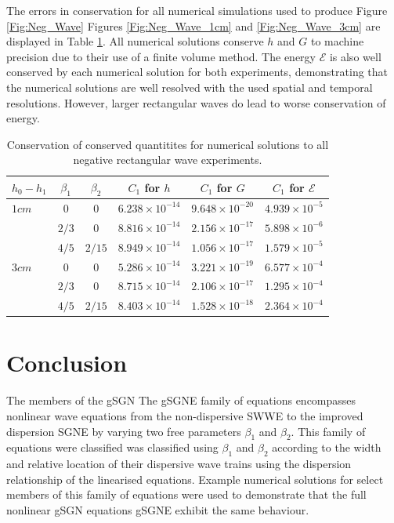 \documentclass[10pt]{elsarticle}
\newcommand\T{\rule{0pt}{3ex }}       %
\newcommand\B{\rule[-4ex]{0pt}{4ex }} %
\providecommand{\DIFaddtex}[1]{{\protect\color{blue} \sf #1}} %
\providecommand{\DIFdeltex}[1]{{\protect\color{red} \scriptsize #1}} %
\providecommand{\DIFaddbegin}{} %
\providecommand{\DIFaddend}{} %
\providecommand{\DIFdelbegin}{} %
\providecommand{\DIFdelend}{} %
\providecommand{\DIFadd}[1]{\texorpdfstring{\DIFaddtex{#1}}{#1}} %
\providecommand{\DIFdel}[1]{\texorpdfstring{\DIFdeltex{#1}}{}} %
\newcommand{\DIFscaledelfig}{0.5}
\newlength{\DIFdelgraphicswidth} %
\newlength{\DIFdelgraphicsheight} %
\newcommand{\DIFaddincludegraphics}[2][]{{\color{blue}\fbox{\DIFOincludegraphics[#1]{#2}}}} %
\newcommand{\DIFdelincludegraphics}[2][]{%
\sbox{\DIFdelgraphicsbox}{\DIFOincludegraphics[#1]{#2}}%
\settoboxwidth{\DIFdelgraphicswidth}{\DIFdelgraphicsbox} %
\settoboxtotalheight{\DIFdelgraphicsheight}{\DIFdelgraphicsbox} %
\scalebox{\DIFscaledelfig}{%
\parbox[b]{\DIFdelgraphicswidth}{\usebox{\DIFdelgraphicsbox}\\[-\baselineskip] \rule{\DIFdelgraphicswidth}{0em}}\llap{\resizebox{\DIFdelgraphicswidth}{\DIFdelgraphicsheight}{%
\setlength{\unitlength}{\DIFdelgraphicswidth}%
\begin{picture}(1,1)%
\thicklines\linethickness{2pt} %
{\color[rgb]{1,0,0}\put(0,0){\framebox(1,1){}}}%
{\color[rgb]{1,0,0}\put(0,0){\line( 1,1){1}}}%
{\color[rgb]{1,0,0}\put(0,1){\line(1,-1){1}}}%
\end{picture}%
}\hspace*{3pt}}} %
} %
\DeclareRobustCommand{\DIFaddbegin}{\DIFOaddbegin \let\includegraphics\DIFaddincludegraphics} %
\DeclareRobustCommand{\DIFaddend}{\DIFOaddend \let\includegraphics\DIFOincludegraphics} %
\DeclareRobustCommand{\DIFdelbegin}{\DIFOdelbegin \let\includegraphics\DIFdelincludegraphics} %
\DeclareRobustCommand{\DIFdelend}{\DIFOaddend \let\includegraphics\DIFOincludegraphics} %
\begin{document}
The errors in conservation for all numerical simulations used to produce \DIFdelbegin \DIFdel{Figure \ref{Fig:Neg_Wave} }\DIFdelend \DIFaddbegin \DIFadd{Figures \ref{Fig:Neg_Wave_1cm} and \ref{Fig:Neg_Wave_3cm} }\DIFaddend are displayed in Table \ref{tab:Neg_Wave_Cons}. All numerical solutions conserve $h$ and $G$ to machine precision due to their use of a finite volume method. The energy $\mathcal{E}$ is also well conserved by each numerical solution for both experiments, demonstrating that the numerical solutions are well resolved with the used spatial and temporal resolutions. However, larger rectangular waves do lead to worse conservation of energy. 

\begin{table}
	\centering
	\begin{tabular}{l c c c c c}
		$h_0 - h_1$& $\beta_1$ & $\beta_2$ &$C_1$ for $h$ & $C_1$ for $G$ & $C_1$ for $\mathcal{E}$ \B \\
		\hline 
		$1cm$ &$0$ & $0$ & $6.238\times 10^{-14}$&    $9.648\times 10^{-20}$ & $4.939\times 10^{-5}$ \T\\
		&$2/3$ & $0$ &   $8.816\times 10^{-14}$  &  $2.156\times 10^{-17}$  &  $5.898\times 10^{-6}$
		\T\\	
		&$4/5$ & $2/15$ &   $8.949\times 10^{-14}$   &  $1.056\times 10^{-17}$  &  $1.579\times 10^{-5}$ \T \B\\
		\hline 
		$3cm$ &$0$ & $0$ & $5.286\times 10^{-14}$  &  $3.221\times 10^{-19}$  &  $6.577\times 10^{-4}$ \T\\
		&$2/3$ & $0$ & $8.715\times 10^{-14}$   &  $2.106\times 10^{-17}$  &  $1.295\times 10^{-4}$ \T\\
		&$4/5$ & $2/15$ & $8.403\times 10^{-14}$ &  $1.528\times 10^{-18}$  &  $2.364\times 10^{-4}$  \T\\
	\end{tabular}
	\caption{Conservation of conserved quantitites for numerical solutions to all negative rectangular wave experiments.}
	\label{tab:Neg_Wave_Cons}
\end{table} 


\section{Conclusion}
\DIFdelbegin \DIFdel{The members of the gSGN }\DIFdelend \DIFaddbegin \DIFadd{The gSGNE family of equations encompasses nonlinear wave equations from the non-dispersive SWWE to the improved dispersion SGNE by varying two free parameters $\beta_1$ and $\beta_2$. This }\DIFaddend family of equations \DIFdelbegin \DIFdel{were classified }\DIFdelend \DIFaddbegin \DIFadd{was classified using  $\beta_1$ and $\beta_2$ }\DIFaddend according to the width and relative location of their dispersive wave trains using the dispersion relationship of the linearised equations. Example numerical solutions for select members of this family of equations were used to demonstrate that the full nonlinear \DIFdelbegin \DIFdel{gSGN equations }\DIFdelend \DIFaddbegin \DIFadd{gSGNE }\DIFaddend exhibit the same behaviour. 
\end{document}

